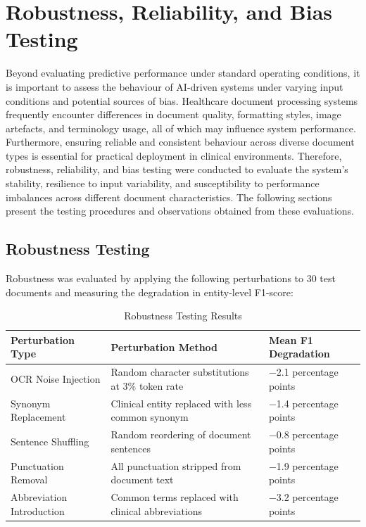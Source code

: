 \section{Robustness, Reliability, and Bias Testing}

Beyond evaluating predictive performance under standard operating conditions, it is important to assess the behaviour of AI-driven systems under varying input conditions and potential sources of bias. Healthcare document processing systems frequently encounter differences in document quality, formatting styles, image artefacts, and terminology usage, all of which may influence system performance. Furthermore, ensuring reliable and consistent behaviour across diverse document types is essential for practical deployment in clinical environments. Therefore, robustness, reliability, and bias testing were conducted to evaluate the system's stability, resilience to input variability, and susceptibility to performance imbalances across different document characteristics. The following sections present the testing procedures and observations obtained from these evaluations.

\subsection{Robustness Testing}
Robustness was evaluated by applying the following perturbations to 30 test documents and measuring the degradation in entity-level F1-score:

\begin{table}[htbp]
\centering
\caption{Robustness Testing Results}
\label{tab:robustness}
\begin{tabular}{|p{4cm}|p{6cm}|p{3.5cm}|}
\hline
\textbf{Perturbation Type} & \textbf{Perturbation Method} & \textbf{Mean F1 Degradation} \\
\hline
OCR Noise Injection & Random character substitutions at 3\% token rate & $-$2.1 percentage points \\
\hline
Synonym Replacement & Clinical entity replaced with less common synonym & $-$1.4 percentage points \\
\hline
Sentence Shuffling & Random reordering of document sentences & $-$0.8 percentage points \\
\hline
Punctuation Removal & All punctuation stripped from document text & $-$1.9 percentage points \\
\hline
Abbreviation Introduction & Common terms replaced with clinical abbreviations & $-$3.2 percentage points \\
\hline
\end{tabular}
\end{table}

